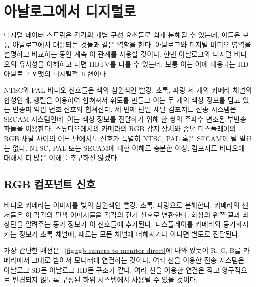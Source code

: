 \chapter{아날로그에서 디지털로}

디지털 데이터 스트림은 각각의 개별 구성 요소들로 쉽게 분해될 수 있는데, 이들은 보통 아날로그에서 대응되는 것들과 같은 역할을 한다.
아날로그와 디지털 비디오 영역을 설명하고 비교하는 동안 계속 이 관계를 사용할 것이다.
한번 아날로그와 디지털 비디오의 유사성을 이해하고 나면 HDTV를 다룰 수 있는데, 보통 이는 이에 대응되는 HD 아날로그 포맷의 디지털적 표현이다.


NTSC와 PAL 비디오 신호들은 색의 삼원색인 빨강, 초록, 파랑 세 개의 카메라 채널의 합성인데, 행렬을 이용하여 합쳐져서 휘도를 만들고 이는 두 개의 색상 정보를 담고 있는 반송파 억압 변조 신호와 합쳐진다.
세 번쨰 단일 채널 컴포지트 전송 시스템은 SECAM 시스템인데, 이는 색상 정보를 전달하기 위해 한 쌍의 주파수 변조된 부반송파들을 이용한다.
스튜디오에서의 카메라의 RGB 감지 장치와 종단 디스플레이의 RGB 채널 사이의 어느 단에서도 신호가 특별히 NTSC, PAL 혹은 SECAM이 될 필요는 없다.
NTSC, PAL 또는 SECAM에 대한 이해로 충분한 이상, 컴포지트 비디오에 대해서 더 많은 이해를 추구하진 않겠다.

\section{RGB 컴포넌트 신호}
비디오 카메라는 이미지를 빛의 삼원색인 빨강, 초록, 파랑으로 분해한다. 카메라의 센서들은 이 각각의 단색 이미지들을 각각의 전기 신호로 변환한다.
화상의 왼쪽 끝과 최상단을 알려주는 동기 정보가 이 신호들에 추가된다. 디스플레이를 카메라와 동기화시키는 정보가 초록 채널에, 때로는 모든 채널에 더해지거나 아니면 별도로 전달된다.


가장 간단한 배선은 \figurename~\ref{fig:rgb camera to monitor direct}에 나와 있듯이 R, G, B를 카메라에서 그대로 받아서 모니터에 연결하는 것이다. 여러 선을 이용한 전송 시스템은 아날로그 SD든 아날로그 HD든 구조가 같다.
여러 선을 이용한 연결은 작고 영구적으로 변경되지 않도록 구성된 하위 시스템에서 사용될 수 있을 것이다.


